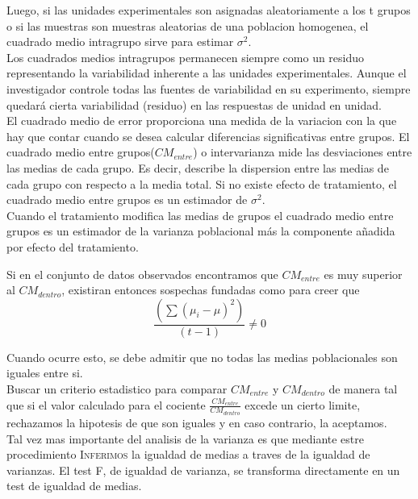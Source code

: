 \documentclass[10pt,a4paper]{article}
\begin{document}
Luego, si las unidades experimentales son asignadas aleatoriamente a los t grupos o si las muestras son muestras aleatorias de una poblacion homogenea, el cuadrado medio intragrupo sirve para estimar $\sigma^2$.\\

Los cuadrados medios intragrupos permanecen siempre como un residuo representando la variabilidad inherente a las unidades experimentales. Aunque el investigador controle todas las fuentes de variabilidad en su experimento, siempre quedará cierta variabilidad (residuo) en las respuestas de unidad en unidad.\\

El cuadrado medio de error proporciona una medida de la variacion con la que hay que contar cuando se desea calcular diferencias significativas entre grupos. El cuadrado medio entre grupos($CM_{entre}$) o intervarianza mide las desviaciones entre las medias de cada grupo. Es decir, describe la dispersion entre las medias de cada grupo con respecto a la media total. Si no existe efecto de tratamiento, el cuadrado medio entre grupos es un estimador de $\sigma^2$.\\

Cuando el tratamiento modifica las medias de grupos el cuadrado medio entre grupos es un estimador de la varianza poblacional más la componente añadida por efecto del tratamiento.

Si en el conjunto de datos observados encontramos que $CM_{entre}$ es muy superior al $CM_{dentro}$, existiran entonces sospechas fundadas como para creer que
\begin{equation}
	\frac{\left(\sum(\mu_i-\mu)^2\right)}{(t-1)}\neq 0
\end{equation}

Cuando ocurre esto, se debe admitir que no todas las medias poblacionales son iguales entre si.\\

Buscar un criterio estadistico para comparar $CM_{entre}$ y $CM_{dentro}$ de manera tal que si el valor calculado para el cociente $\frac{CM_{entre}}{CM_{dentro}}$ excede un cierto limite, rechazamos la hipotesis de que son iguales y en caso contrario, la aceptamos.\\

Tal vez mas importante del analisis de la varianza es que mediante estre procedimiento \textsc{Inferimos} la igualdad de medias a traves de la igualdad de varianzas. El test F, de igualdad de varianza, se transforma directamente en un test de igualdad de medias.\\
\end{document}
